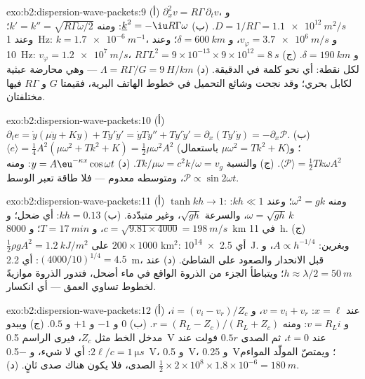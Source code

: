 \begin{solution}{exo:b2:dispersion-wave-packets:9}
(أ) $\partial_x^2v = R\Gamma\,\partial_tv$، و $D = 1/R\Gamma = \qty{1.1e12}{m^2/s}$. (ب) $\underline k^2
= -\iu R\Gamma\omega$: ومنه $k' = k'' = \sqrt{R\Gamma\omega/2}$؛ وعند \qty{1}{Hz}: $k = \qty{1.7e-6}{m^{-1}}$،
و $v_\varphi = \qty{3.7e6}{m/s}$، و $\delta = \qty{600}{km}$؛ وعند \qty{10}{Hz}: $v_\varphi = \qty{1.2e7}{m/s}$،
و $\delta = \qty{190}{km}$. (ج) $R\Gamma L^2 = 9 \times 10^{-13} \times 9 \times 10^{12} = \qty{8}{s}$
لكل نقطة: أي نحو كلمة في الدقيقة. (د) $\Lambda = R\Gamma/G = \qty{9}{H/km}$ --- وهي
محارضة عبثية لكابل بحري؛ وقد نجحت وشائع التحميل في خطوط
الهاتف البرية، فقيمتا $G$ و $R\Gamma$ فيها مختلفتان.
\end{solution}

\begin{solution}{exo:b2:dispersion-wave-packets:10}
(أ) $\partial_te = \dot y(\mu\ddot y + Ky) + Ty'\dot y' = \dot yTy'' + Ty'\dot y' = \partial_x
(Ty'\dot y) = -\partial_x\mathcal P$. (ب) $\langle e\rangle = \tfrac14A^2(\mu\omega^2 + Tk^2 + K) =
\tfrac12\mu\omega^2A^2$ (باستعمال $\mu\omega^2 = Tk^2 + K$)؛ و $\langle\mathcal P\rangle = \tfrac12Tk\omega
A^2$. (ج) والنسبة $Tk/\mu\omega = c^2k/\omega = v_g$. (د) $y = A\eu^{-\kappa x}\cos\omega t$:
ومنه $\mathcal P \propto \sin2\omega t$، ومتوسطه معدوم --- فلا طاقة تعبر الوسط.
\end{solution}

\begin{solution}{exo:b2:dispersion-wave-packets:11}
(أ) $\tanh kh \to 1$: ومنه $\omega^2 = gk$؛ وعند $kh \ll 1$: $\omega = \sqrt{gh}\,k$، والسرعة $\sqrt{gh}$،
وغير متبدّدة. (ب) $kh = 0.13$: أي ضحل؛ و $c = \sqrt{9.81 \times 4000} = \qty{198}{m/s}$،
و $T = \qty{17}{min}$؛ و \qty{8000}{km} في \qty{11}{h}. (ج) $\tfrac12\rho gA^2 = \qty{1.2}{kJ/m^2}$
على $200 \times 1000$ km$^2$: أي \qty{2.5e14}{J}. وبغرين: $A \propto h^{-1/4}$، و $(4000/10)^{1/4}
= 4.5$: أي \qty{2.2}{m}، قبل الانحدار والصعود على الشاطئ. (د) عند $h \approx \lambda/2 =
\qty{50}{m}$؛ ويتباطأ الجزء من الذروة الواقع في ماء أضحل، فتدور
الذروة موازيةً لخطوط تساوي العمق --- أي انكسار.
\end{solution}

\begin{solution}{exo:b2:dispersion-wave-packets:12}
(أ) عند $x = \ell$: $v = v_i + v_r$، و $i = (v_i - v_r)/Z_c$، و $v = R_Li$: ومنه $r = (R_L -
Z_c)/(R_L + Z_c)$. (ب) $0$ و $-1$ و $+1$ و $0.5$. (ج) ويبدو مدخل الخط مثل
$Z_c$، فيرى الراسم \qty{0.5}{V} عند $t = 0$، ثم الصدى $0.5r$ فولت عند
$2\ell/c = \qty{1}{\micro s}$: أي لا شيء، و \qty{-0.5}{V}، و \qty{+0.5}{V}، و \qty{+0.25}{V}؛ ويمتصّ
المولّد المواءم الصدى، فلا يكون هناك صدى ثانٍ. (د)
$\tfrac12 \times 2 \times 10^8 \times 1.8 \times 10^{-6} = \qty{180}{m}$.
\end{solution}

